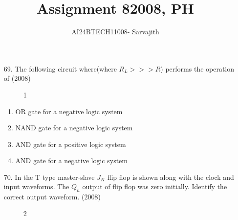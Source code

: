 \documentclass[journal]{IEEEtran}
\begin{document}

\vspace{3cm}


\author{AI24BTECH11008- Sarvajith
}
\title{Assignment 8}
 \maketitle
{\let\newpage\relax\maketitle}
\title{2008, PH}
\renewcommand{\thefigure}{\theenumi}
\renewcommand{\thetable}{\theenumi}
\setlength{\intextsep}{10pt} %
\renewcommand{\thetable}{\theenumi}
\begin{enumerate}
    \item[69.] The following circuit where(where $R_L>>>R$) performs the operation of \hfill (2008)
    \begin{figure}[!ht]
    \centering
    \caption{1}
    \label{fig1}
     \end{figure}
    \begin{enumerate} [label=(\Alph*)]
        \item OR gate for a negative logic system
        \item NAND gate for a negative logic system 
        \item AND gate for a positive logic system
        \item AND gate for a negative logic system
    \end{enumerate}
    \item[70.]  In the T type master-slave $J_K$ flip flop is shown along with the clock and input waveforms. The $Q_n$ output of flip flop was zero initially. Identify the correct output waveform. \hfill (2008)
     
     \begin{figure}[!ht]
      \centering
      \caption{ 2}
      \label{fig2}
     \end{figure}
    
     \begin{figure}[!ht]
      \centering
     \end{figure}
        \begin{figure}[!ht]
          \centering
            \end{figure}
            

\end{enumerate}
\end{document}
